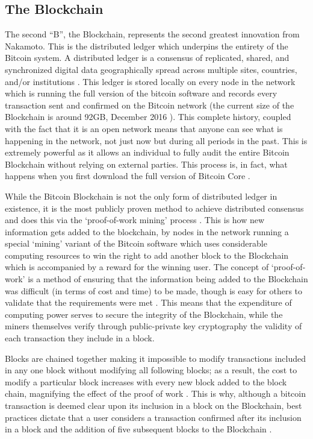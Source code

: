 \documentclass{article}
\begin{document}
\subsection{The Blockchain}

The second ``B'', the Blockchain, represents the second greatest innovation from Nakamoto. This is the distributed ledger which underpins the entirety of the Bitcoin system. A distributed ledger is a consensus of replicated, shared, and synchronized digital data geographically spread across multiple sites, countries, and/or institutions \citep{24_distributed_ledgers_and_blockchain_technology_2016}. This ledger is stored locally on every node in the network which is running the full version of the bitcoin software \citep{14_bitcoin_2009} and records every transaction sent and confirmed on the Bitcoin network (the current size of the Blockchain is around 92GB, December 2016 \citep{25_blockchain_size_2016}). This complete history, coupled with the fact that it is an open network means that anyone can see what is happening in the network, not just now but during all periods in the past. This is extremely powerful as it allows an individual to fully audit the entire Bitcoin Blockchain without relying on external parties. This process is, in fact, what happens when you first download the full version of Bitcoin Core \citep{20_developer_guide_bitcoin_2016}.

While the Bitcoin Blockchain is not the only form of distributed ledger in existence, it is the most publicly proven method to achieve distributed consensus and does this via the `proof-of-work mining' process \citep{24_distributed_ledgers_and_blockchain_technology_2016}. This is how new information gets added to the blockchain, by nodes in the network running a special `mining' variant of the Bitcoin software which uses considerable computing resources to win the right to add another block to the Blockchain which is accompanied by a reward for the winning user. The concept of `proof-of-work' is a method of ensuring that the information being added to the Blockchain was difficult (in terms of cost and time) to be made, though is easy for others to validate that the requirements were met \citep{26_blockchain_mining_-_distributed_ledgers_and_blockchain_technology_2016}. This means that the expenditure of computing power serves to secure the integrity of the Blockchain, while the miners themselves verify through public-private key cryptography the validity of each transaction they include in a block.

Blocks are chained together making it impossible to modify transactions included in any one block without modifying all following blocks; as a result, the cost to modify a particular block increases with every new block added to the block chain, magnifying the effect of the proof of work \citep{20_developer_guide_bitcoin_2016}\citep{38_proof_of_work_-_masterpage_2016}. This is why, although a bitcoin transaction is deemed clear upon its inclusion in a block on the Blockchain, best practices dictate that a user considers a transaction confirmed after its inclusion in a block and the addition of five subsequent blocks to the Blockchain \citep{27_confirmation_-_bitcoin_wiki_2016}.
\end{document}
